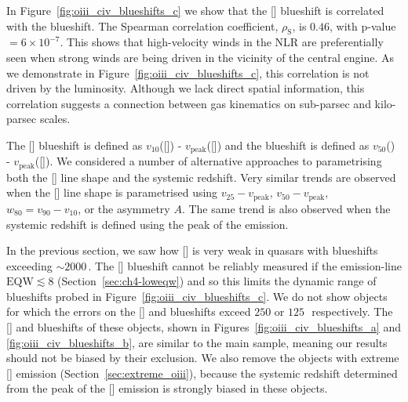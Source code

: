 In Figure~\ref{fig:oiii_civ_blueshifts_c} we show that the [] blueshift is correlated with the  blueshift.
The Spearman correlation coefficient, $\rho_{\text{S}}$, is $0.46$, with p-value $=6\times10^{-7}$. 
This shows that high-velocity winds in the NLR are preferentially seen when strong winds are being driven in the vicinity of the central engine. 
As we demonstrate in Figure~\ref{fig:oiii_civ_blueshifts_c}, this correlation is not driven by the luminosity. 
Although we lack direct spatial information, this correlation suggests a connection between gas kinematics on sub-parsec and kilo-parsec scales. 

The [] blueshift is defined as $v_{10}$([]) - $v_{\text{peak}}$([]) and the  blueshift is defined as $v_{50}$() - $v_{\text{peak}}$([]).
We considered a number of alternative approaches to parametrising both the [] line shape and the systemic redshift. 
Very similar trends are observed when the [] line shape is parametrised using $v_{25} - v_{\text{peak}}$, $v_{50} - v_{\text{peak}}$, $w_{80} = v_{90} - v_{10}$, or the asymmetry $A$.
The same trend is also observed when the systemic redshift is defined using the peak of the \hb emission. 

In the previous section, we saw how [] is very weak in quasars with  blueshifts exceeding $\sim2000$\,\kms. 
The [] blueshift cannot be reliably measured if the emission-line $\text{EQW} \lesssim 8$ (Section~\ref{sec:ch4-loweqw}) and so this limits the dynamic range of  blueshifts probed in Figure~\ref{fig:oiii_civ_blueshifts_c}. 
We do not show objects for which the errors on the [] and  blueshifts exceed $250$ or $125$\,\kms\, respectively. 
The [] and  blueshifts of these objects, shown in Figures~\ref{fig:oiii_civ_blueshifts_a} and \ref{fig:oiii_civ_blueshifts_b}, are similar to the main sample, meaning our results should not be biased by their exclusion.  
We also remove the objects with extreme [] emission (Section~\ref{sec:extreme_oiii}), because the systemic redshift determined from the peak of the [] emission is strongly biased in these objects. 

